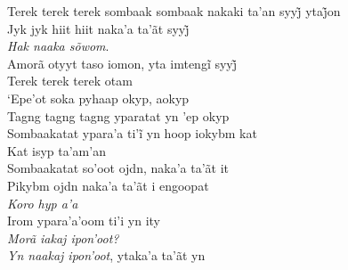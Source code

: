 \bigskip

\begin{linenumbers}\begingroup\raggedright

\noindent   Terek terek terek sombaak sombaak nakaki ta’an syyj̃ ytaj̃on\\
  Jyk jyk hiit hiit naka’a ta’ãt syyj̃\\
  \emph{Hak naaka sõwom}.\\
  Amorã otyyt taso iomon, yta imtengĩ syyj̃\\
  Terek terek terek otam\\
  `Epe'ot soka pyhaap okyp, aokyp\\
  Tagng tagng tagng yparatat yn 'ep okyp\\
  Sombaakatat ypara’a ti’ĩ yn hoop iokybm kat\\
  Kat isyp ta'am'an\\
  Sombaakatat so'oot ojdn, naka'a ta'ãt it\\
  Pikybm ojdn naka'a ta'ãt i engoopat\\
  \emph{Koro hyp a'a}\\
  Irom ypara'a'oom ti'i yn ity\\
  \emph{Morã iakaj ipon'oot?}\\
  \emph{Yn naakaj ipon'oot}, ytaka'a ta'ãt yn\\

\end{linenumbers}
